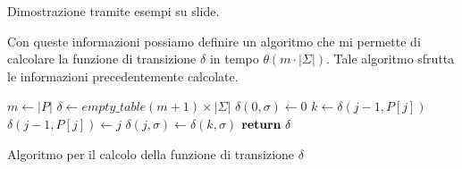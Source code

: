 \begin{nota}
    Dimostrazione tramite esempi su slide.
\end{nota}
Con queste informazioni possiamo definire un algoritmo che mi permette di calcolare la funzione di transizione $\delta$ in tempo $\theta(m \cdot |\Sigma|)$. Tale algoritmo sfrutta le informazioni precedentemente calcolate.
\begin{algorithm}[!ht]
  \begin{algorithmic}
    \State $m\gets |P|$
    \State $\delta \gets empty\_table (m + 1) \times | \Sigma|$
    \For{$\sigma \in \Sigma$}
        \State $\delta(0, \sigma) \gets 0$
    \EndFor
        \State $k \gets \delta(j - 1, P[j])$
        \State $\delta(j - 1, P[j]) \gets j$
        \For{$\sigma \in \Sigma$}
            \State $\delta(j, \sigma) \gets \delta(k, \sigma)$
        \EndFor
    \EndFor
    \State $\text{\textbf{return}} \ \delta$
    \EndFunction
  \end{algorithmic}
  \caption{Algoritmo per il calcolo della funzione di transizione $\delta$}
\end{algorithm}
\newpage
